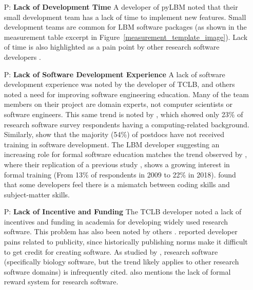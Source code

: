 \documentclass[final, 3p, times, authoryear]{elsarticle}
\newcounter{pnum} %
\begin{document}
\begin{enumerate}

	\item[P\refstepcounter{pnum}\thepnum \label{P_LackDevTime}:] \textbf{Lack of
	Development Time} A developer of pyLBM noted that their small development
	team has a lack of time to implement new features. Small development teams
	are common for LBM software packages (as shown in the measurement table
	excerpt in Figure~\ref{measurement_template_image}). Lack of time is also
	highlighted as a pain point by other research software developers
	\citet{PintoEtAl2018, PintoEtAl2016, WieseEtAl2019}.

	\item[P\refstepcounter{pnum}\thepnum \label{P_LackSoftDevExp}:] \textbf{Lack
	of Software Development Experience} A lack of software development
	experience was noted by the developer of TCLB, and others noted a need for
	improving software engineering education. Many of the team members on their
	project are domain experts, not computer scientists or software engineers.
	This same trend is noted by \citet{Nguyen-HoanEtAl2010}, which showed only
	23\% of research software survey respondents having a computing-related
	background. Similarly, \citep{UditAndKatz2017} show that the majority (54\%)
	of postdocs have not received training in software development.  The LBM
	developer suggesting an increasing role for formal software education
	matches the trend observed by \citet{PintoEtAl2018}, where their replication
	of a previous study \citep{HannayEtAl2009}, shows a growing interest in
	formal training (From 13\% of respondents in 2009 to 22\% in 2018).
	\citep{PintoEtAl2018} found that some developers feel there is a mismatch
	between coding skills and subject-matter skills. 
	
	\item[P\refstepcounter{pnum}\thepnum \label{P_LackFunding}:] \textbf{Lack of
	Incentive and Funding} The TCLB developer noted a lack of incentives and
	funding in academia for developing widely used research software. This
	problem has also been noted by others \citep{gewaltig2012quality, Goble2014,
	KaterbowAndFeulner2018}.  \citet{WieseEtAl2019} reported developer pains
	related to publicity, since historically publishing norms make it difficult
	to get credit for creating software.  As studied by
	\citet{HowisonAndBullard2016}, research software (specifically biology
	software, but the trend likely applies to other research software domains)
	is infrequently cited.  \citep{PintoEtAl2018} also mentions the lack of
	formal reward system for research software.


\end{enumerate}
\end{document}
